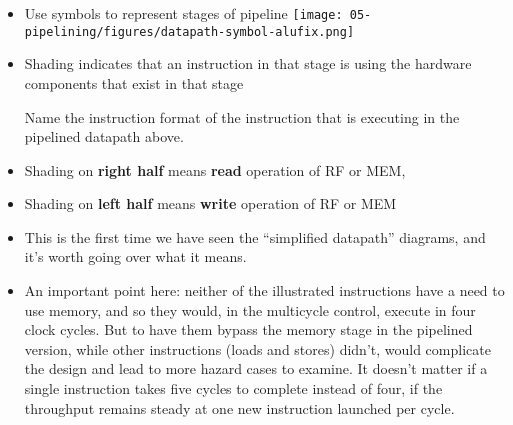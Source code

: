 \begin{frame}[fragile]
\begin{itemize}
\item Use symbols to represent stages of pipeline
\texttt{[image: 05-pipelining/figures/datapath-symbol-alufix.png]}

\item Shading indicates that an instruction in that stage is using the hardware components that exist in that stage
 \begin{tcolorbox}[enhanced,attach boxed title to top center={yshift=-3mm,yshifttext=-1mm},
  colback=blue!5!white,colframe=blue!75!black,colbacktitle=blue!80!black,
  title=Think About It,fonttitle=\bfseries,
  boxed title style={size=small,colframe=red!50!black} ]
Name the instruction format of the instruction that is executing in the pipelined datapath above.\ifnum{}\fi
  \end{tcolorbox}
\item Shading on \textbf{right half} means \textbf{read} operation of RF or MEM, 
\item Shading on \textbf{left half} means \textbf{write} operation of RF or MEM 
\end{itemize}
\BNotes\ifnum{}
\begin{itemize}
\item This is the first time we have seen the ``simplified datapath''
diagrams, and it's worth going over what it means.  
\item An important point
  here: neither of the illustrated instructions have a need to use
  memory, and so they would, in the multicycle control, execute in four
  clock cycles. But to have them bypass the memory stage in the
  pipelined version, while other instructions (loads and stores) didn't,
  would complicate the design and lead to more hazard cases to
  examine. It doesn't matter if a single instruction takes five cycles
  to complete instead of four, if the throughput remains steady at one
  new instruction launched per cycle.
\end{itemize}
\fi\ENotes
\end{frame}

